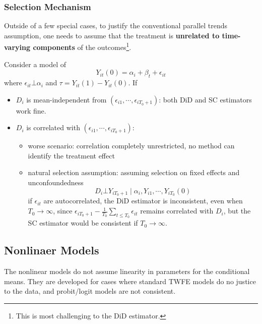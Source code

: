\documentclass[twoside]{article}
\begin{document}
\subsubsection{Selection Mechanism}
Outside of a few special cases, to justify the conventional parallel trends assumption, one needs to assume that the treatment is \textbf{unrelated to time-varying components} of the outcomes\footnote{This is most challenging to the DiD estimator.}.

Consider a model of $$ Y_{it}(0) = \alpha_i + \beta_t + \epsilon_{it} $$ where $\epsilon_{it}\bot \alpha_i$ and $\tau=Y_{it}(1)-Y_{it}(0)$. If
\begin{itemize}
    \item $D_i$ is mean-independent from $\left(\epsilon_{i1},\cdots,\epsilon_{iT_0+1}\right)$: both DiD and SC estimators work fine.
    \item $D_i$ is correlated with $\left(\epsilon_{i1},\cdots,\epsilon_{iT_0+1}\right)$:
    \begin{itemize}
        \item worse scenario: correlation completely unrestricted, no method can identify the treatment effect 
        \item natural selection assumption: assuming selection on fixed effects and unconfoundedness $$ D_i\bot Y_{iT_0+1}\mid \alpha_i,Y_{i1},\cdots,Y_{iT_0}(0) $$
        if $\epsilon_{it}$ are autocorrelated, the DiD estimator is inconsistent, even when $T_0\rightarrow\infty$, since $\epsilon_{iT_0+1}-\frac{1}{T_0}\sum_{t\leq T_0}\epsilon_{it}$ remains correlated with $D_i$, but the SC estimator would be consistent if $T_0\rightarrow\infty$.
    \end{itemize}
\end{itemize} 

\subsection{Nonlinaer Models}
The nonlinear models do not assume linearity in parameters for the conditional means. They are developed for cases where standard TWFE models do no justice to the data, and probit/logit models are not consistent.
\end{document}
